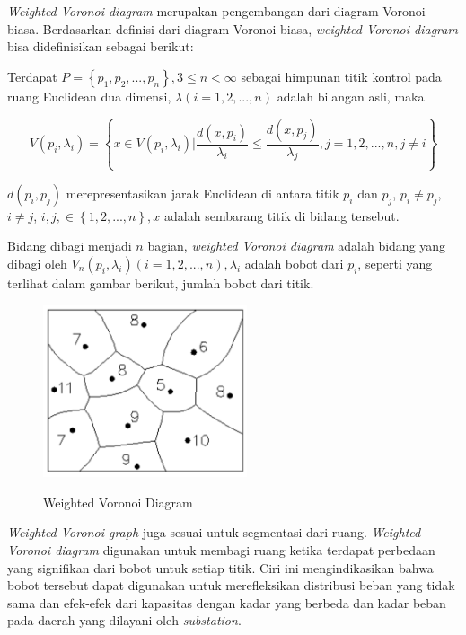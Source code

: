 \textit{Weighted Voronoi diagram} merupakan pengembangan dari diagram Voronoi biasa. Berdasarkan definisi dari diagram Voronoi biasa, \textit{weighted Voronoi diagram} bisa didefinisikan sebagai berikut:

Terdapat $P = \left \{p_{1}, p_{2},...,p_{n}\right \}, 3 \leq n < \infty$ sebagai himpunan titik kontrol pada ruang Euclidean dua dimensi, $\lambda \left(i = 1,2,...,n\right)$ adalah bilangan asli, maka

\begin{equation} \label{eq3}
	V\left(p_{i},\lambda_{i}\right)=\left \{x \in V\left(p_{i},\lambda_{i}\right) | \frac{d\left (x,p_{i} \right )}{\lambda_{i}} \leq \frac{d\left (x,p_{j} \right )}{\lambda_{j}}, j = 1,2,...,n, j \neq i \right \}
\end{equation}

$d\left(p_{i},p_{j}\right)$ merepresentasikan jarak Euclidean di antara titik $p_{i}$ dan $p_{j}$, $p_{i} \neq p_{j}$, $i \neq j$, $i, j, \in \left \{1,2,...,n\right \}, x$ adalah sembarang titik di bidang tersebut.

Bidang dibagi menjadi $n$ bagian, \textit{weighted Voronoi diagram} adalah bidang yang dibagi oleh $V_{n}\left(p_{i},\lambda_{i}\right) \left(i = 1,2,...,n\right), \lambda_{i}$ adalah bobot dari $p_{i}$, seperti yang terlihat dalam gambar berikut, jumlah bobot dari titik.

\begin{figure}
	\centering
	\includegraphics[width=6cm]{pics/weightedVoronoiDiagram.png}
	\caption{Weighted Voronoi Diagram}
	\label{fig:weightedVoronoiDiagram}
	\cite{substation}
\end{figure}

\textit{Weighted Voronoi graph} juga sesuai untuk segmentasi dari ruang. \textit{Weighted Voronoi diagram} digunakan untuk membagi ruang ketika terdapat perbedaan yang signifikan dari bobot untuk setiap titik. Ciri ini mengindikasikan bahwa bobot tersebut dapat digunakan untuk merefleksikan distribusi beban yang tidak sama dan efek-efek dari kapasitas dengan kadar yang berbeda dan kadar beban pada daerah yang dilayani oleh \textit{substation}.

